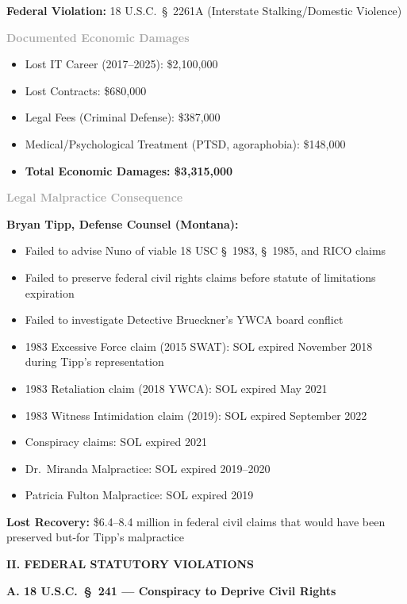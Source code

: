 \documentclass[11pt, letterpaper]{article}
\newcommand{\sectiontitle}[1]{\vspace{0.2in}\noindent\textcolor{NavyBlue}{\large\textbf{#1}}\vspace{0.1in}}
\newcommand{\subsectiontitle}[1]{\vspace{0.15in}\noindent\textcolor{NavyBlue}{\textbf{#1}}\vspace{0.05in}}
\newcommand{\subsubsectiontitle}[1]{\vspace{0.1in}\noindent\textcolor{DarkGray}{\textbf{#1}}\vspace{0.05in}}
\begin{document}
\textbf{Federal Violation:} 18 U.S.C.\ \S\ 2261A (Interstate Stalking/Domestic Violence)

\subsubsectiontitle{Documented Economic Damages}
\begin{itemize}[leftmargin=*,itemsep=2pt]
    \item Lost IT Career (2017--2025): \$2,100,000
    \item Lost Contracts: \$680,000
    \item Legal Fees (Criminal Defense): \$387,000
    \item Medical/Psychological Treatment (PTSD, agoraphobia): \$148,000
    \item \textbf{Total Economic Damages: \$3,315,000}
\end{itemize}

\subsubsectiontitle{Legal Malpractice Consequence}

\textbf{Bryan Tipp, Defense Counsel (Montana):}
\begin{itemize}[leftmargin=*,itemsep=2pt]
    \item Failed to advise Nuno of viable 18 USC \S\ 1983, \S\ 1985, and RICO claims
    \item Failed to preserve federal civil rights claims before statute of limitations expiration
    \item Failed to investigate Detective Brueckner's YWCA board conflict
    \item 1983 Excessive Force claim (2015 SWAT): SOL expired November 2018 during Tipp's representation
    \item 1983 Retaliation claim (2018 YWCA): SOL expired May 2021
    \item 1983 Witness Intimidation claim (2019): SOL expired September 2022
    \item Conspiracy claims: SOL expired 2021
    \item Dr.\ Miranda Malpractice: SOL expired 2019--2020
    \item Patricia Fulton Malpractice: SOL expired 2019
\end{itemize}

\textbf{Lost Recovery:} \$6.4--8.4 million in federal civil claims that would have been preserved but-for Tipp's malpractice

\sectiontitle{II. FEDERAL STATUTORY VIOLATIONS}

\subsectiontitle{A. 18 U.S.C.\ \S\ 241 --- Conspiracy to Deprive Civil Rights}
\end{document}
